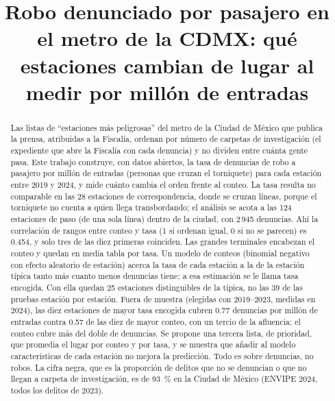 \documentclass[conference]{IEEEtran}
\begin{document}
\title{Robo denunciado por pasajero en el metro de la CDMX: qué estaciones cambian de lugar al medir por millón de entradas}

\author{
}

\maketitle

\begin{abstract}
Las listas de ``estaciones más peligrosas'' del metro de la Ciudad de México que publica la prensa, atribuidas a la Fiscalía, ordenan por número de carpetas de investigación (el expediente que abre la Fiscalía con cada denuncia) y no dividen entre cuánta gente pasa. Este trabajo construye, con datos abiertos, la tasa de denuncias de robo a pasajero por millón de entradas (personas que cruzan el torniquete) para cada estación entre 2019 y 2024, y mide cuánto cambia el orden frente al conteo. La tasa resulta no comparable en las 28 estaciones de correspondencia, donde se cruzan líneas, porque el torniquete no cuenta a quien llega transbordando; el análisis se acota a las 124 estaciones de paso (de una sola línea) dentro de la ciudad, con 2\,945 denuncias. Ahí la correlación de rangos entre conteo y tasa (1 si ordenan igual, 0 si no se parecen) es 0.454, y solo tres de las diez primeras coinciden. Las grandes terminales encabezan el conteo y quedan en media tabla por tasa. Un modelo de conteos (binomial negativo con efecto aleatorio de estación) acerca la tasa de cada estación a la de la estación típica tanto más cuanto menos denuncias tiene; a esa estimación se le llama tasa encogida. Con ella quedan 25 estaciones distinguibles de la típica, no las 39 de las pruebas estación por estación. Fuera de muestra (elegidas con 2019--2023, medidas en 2024), las diez estaciones de mayor tasa encogida cubren 0.77 denuncias por millón de entradas contra 0.57 de las diez de mayor conteo, con un tercio de la afluencia; el conteo cubre más del doble de denuncias. Se propone una tercera lista, de prioridad, que promedia el lugar por conteo y por tasa, y se muestra que añadir al modelo características de cada estación no mejora la predicción. Todo es sobre denuncias, no robos. La cifra negra, que es la proporción de delitos que no se denuncian o que no llegan a carpeta de investigación, es de 93~\% en la Ciudad de México (ENVIPE 2024, todos los delitos de 2023).
\end{abstract}
\end{document}

